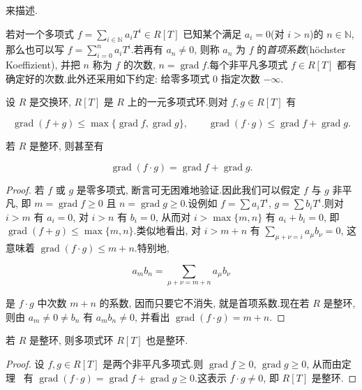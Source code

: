 来描述.

若对一个多项式 $f = \sum_{i \in \mathbb{N}} a_i T^i \in R[T]$ 已知某个满足 $a_i = 0$(对 $i > n$)的 $n \in \mathbb{N}$, 那么也可以写 $f = \sum_{i = 0}^{n} a_i T^i$.若再有 $a_n \neq 0$, 则称 $a_n$ 为 $f$ 的\emph{首项系数}(\textup{höchster Koeffizient}), 并把 $n$ 称为 $f$ 的次数, $n = \operatorname{grad} f$.每个非平凡多项式 $f \in R[T]$ 都有确定好的次数.此外还采用如下约定: 给零多项式 $0$ 指定次数 $- \infty$.

\begin{theorem}\label{thm:5.1.2}
设 $R$ 是交换环, $R[T]$ 是 $R$ 上的一元多项式环.则对 $f, g \in R[T]$ 有

\[
\operatorname{grad}(f + g) \leq \max\{\operatorname{grad} f, \operatorname{grad} g\}, \qquad
\operatorname{grad}(f \cdot g) \leq \operatorname{grad} f + \operatorname{grad} g\text{.}
\]

若 $R$ 是整环, 则甚至有

\[
\operatorname{grad}(f \cdot g) = \operatorname{grad} f + \operatorname{grad} g\text{.}
\]
\end{theorem}

\begin{proof}
若 $f$ 或 $g$ 是零多项式, 断言可无困难地验证.因此我们可以假定 $f$ 与 $g$ 非平凡, 即 $m = \operatorname{grad} f \geq 0$ 且 $n = \operatorname{grad} g \geq 0$.设例如 $f = \sum a_i T^i$, $g = \sum b_i T^i$.则对 $i > m$ 有 $a_i = 0$, 对 $i > n$ 有 $b_i = 0$, 从而对 $i > \max\{m, n\}$ 有 $a_i + b_i = 0$, 即 $\operatorname{grad}(f + g) \leq \max\{m, n\}$.类似地看出, 对 $i > m + n$ 有 $\sum_{\mu + \nu = i} a_\mu b_\nu = 0$, 这意味着 $\operatorname{grad}(f \cdot g) \leq m + n$.特别地,

\[
a_m b_n = \sum_{\mu + \nu = m + n} a_\mu b_\nu
\]

是 $f \cdot g$ 中次数 $m + n$ 的系数, 因而只要它不消失, 就是首项系数.现在若 $R$ 是整环, 则由 $a_m \neq 0 \neq b_n$ 有 $a_m b_n \neq 0$, 并看出 $\operatorname{grad}(f \cdot g) = m + n$.
\end{proof}

\begin{corollary}\label{cor:5.1.3}
若 $R$ 是整环, 则多项式环 $R[T]$ 也是整环.
\end{corollary}

\begin{proof}
设 $f, g \in R[T]$ 是两个非平凡多项式.则 $\operatorname{grad} f \geq 0$, $\operatorname{grad} g \geq 0$, 从而由定理~ 有 $\operatorname{grad}(f \cdot g) = \operatorname{grad} f + \operatorname{grad} g \geq 0$.这表示 $f \cdot g \neq 0$, 即 $R[T]$ 是整环.
\end{proof}

